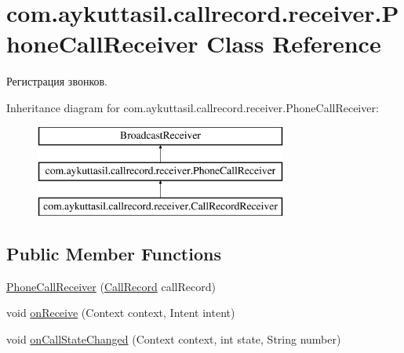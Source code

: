 \hypertarget{classcom_1_1aykuttasil_1_1callrecord_1_1receiver_1_1_phone_call_receiver}{}\section{com.\+aykuttasil.\+callrecord.\+receiver.\+Phone\+Call\+Receiver Class Reference}
\label{classcom_1_1aykuttasil_1_1callrecord_1_1receiver_1_1_phone_call_receiver}


Регистрация звонков.  


Inheritance diagram for com.\+aykuttasil.\+callrecord.\+receiver.\+Phone\+Call\+Receiver\+:\begin{figure}[H]
\begin{center}
\leavevmode
\includegraphics[height=3.000000cm]{classcom_1_1aykuttasil_1_1callrecord_1_1receiver_1_1_phone_call_receiver}
\end{center}
\end{figure}
\subsection*{Public Member Functions}
\begin{DoxyCompactItemize}
\item 
\hyperlink{classcom_1_1aykuttasil_1_1callrecord_1_1receiver_1_1_phone_call_receiver_a8573a80ead7b662c01888587a954f43c}{Phone\+Call\+Receiver} (\hyperlink{classcom_1_1aykuttasil_1_1callrecord_1_1_call_record}{Call\+Record} call\+Record)
\item 
void \hyperlink{classcom_1_1aykuttasil_1_1callrecord_1_1receiver_1_1_phone_call_receiver_afb663077b0c88ec248bd448046be73f6}{on\+Receive} (Context context, Intent intent)
\item 
void \hyperlink{classcom_1_1aykuttasil_1_1callrecord_1_1receiver_1_1_phone_call_receiver_ac2f4b48513270ed65700818b10acd5f8}{on\+Call\+State\+Changed} (Context context, int state, String number)
\end{DoxyCompactItemize}
